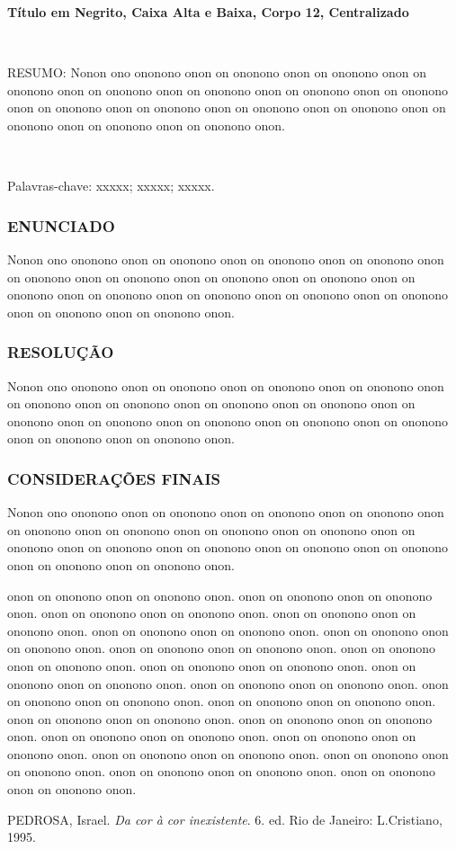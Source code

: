 \documentclass[a4paper,12pt]{article}
\begin{document}
\begin{center}
\textbf{Título em Negrito, Caixa Alta e Baixa, Corpo 12, Centralizado}
\end{center}

\

\hspace{-0.74cm} RESUMO: Nonon ono ononono onon on ononono onon on ononono onon on
ononono onon on ononono onon on ononono onon on ononono onon on ononono
onon on ononono onon on ononono onon on ononono onon on ononono onon on
ononono onon on ononono onon on ononono onon.

\

\hspace{-0.74cm} Palavras-chave: xxxxx; xxxxx; xxxxx.

\subsubsection*{ENUNCIADO} %

Nonon ono ononono onon on ononono onon on ononono onon on ononono
onon on ononono onon on ononono onon on ononono onon on ononono onon on
ononono onon on ononono onon on ononono onon on ononono onon on ononono
onon on ononono onon on ononono onon.

\subsubsection*{RESOLUÇÃO}

Nonon ono ononono onon on ononono onon on ononono onon on ononono
onon on ononono onon on ononono onon on ononono onon on ononono onon on
ononono onon on ononono onon on ononono onon on ononono onon on ononono
onon on ononono onon on ononono onon.

\subsubsection*{CONSIDERAÇÕES FINAIS}

Nonon ono ononono onon on ononono onon on ononono onon on ononono
onon on ononono onon on ononono onon on ononono onon on ononono onon on
ononono onon on ononono onon on ononono onon on ononono onon on ononono
onon on ononono onon on ononono onon.

onon on ononono onon on ononono onon.
onon on ononono onon on ononono onon.
onon on ononono onon on ononono onon.
onon on ononono onon on ononono onon.
onon on ononono onon on ononono onon.
onon on ononono onon on ononono onon.
onon on ononono onon on ononono onon.
onon on ononono onon on ononono onon.
onon on ononono onon on ononono onon.
onon on ononono onon on ononono onon.
onon on ononono onon on ononono onon.
onon on ononono onon on ononono onon.
onon on ononono onon on ononono onon.
onon on ononono onon on ononono onon.
onon on ononono onon on ononono onon.
onon on ononono onon on ononono onon.
onon on ononono onon on ononono onon.
onon on ononono onon on ononono onon.
onon on ononono onon on ononono onon.
onon on ononono onon on ononono onon.
onon on ononono onon on ononono onon.

\begin{thebibliography}{99}
PEDROSA, Israel. {\it Da cor à cor inexistente}. 6. ed. Rio de Janeiro: L.Cristiano, 1995.
\end{thebibliography}
\end{document}
